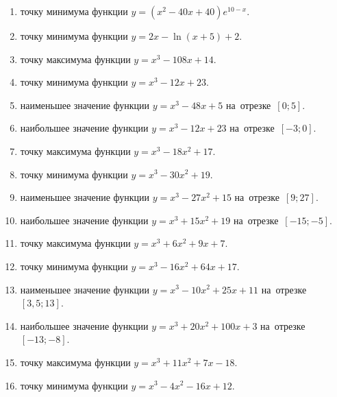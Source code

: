 \documentclass[a4paper,10pt]{article}
\begin{document}
\begin{enumerate}
\item {} точку минимума функции $y=\left(x^2-40x+40\right){{e}^{10-x}}$.

\item {} точку минимума функции $y=2x-\ln \left(x+5\right)+2$.

\item {} точку максимума функции $y=x^3 -108x +14$.

\item {} точку минимума функции $y=x^3 -12x+23$.

\item {} наименьшее значение функции $y=x^3 -48x+5$ на~отрезке~$\left[0;5\right]$.

\item {} наибольшее значение функции $y=x^3 -12x+23$ на~отрезке~$\left[-3;0\right]$.

\item {} точку максимума функции $y=x^3 -18x^2+17$.

\item {} точку минимума функции $y=x^3 -30x^2+19$.

\item {} наименьшее значение функции $y=x^3 -27x^2+15$ на~отрезке~$\left[9;27\right]$.

\item {} наибольшее значение функции $y=x^3 +15x^2+19$ на~отрезке~$\left[-15;-5\right]$.

\item {} точку максимума функции $y=x^3 +6x^2+9x+7$.

\item {} точку минимума функции $y=x^3 -16x^2+64x+17$.

\item {} наименьшее значение функции $y=x^3 -10x^2+25x+11$ на~отрезке~$\left[3,5;13\right]$.

\item {} наибольшее значение функции $y=x^3 +20x^2+100x+3$ на~отрезке~$\left[-13;-8\right]$.

\item {} точку максимума функции $y=x^3 +11x^2+7x-18$.

\item {} точку минимума функции $y=x^3 -4x^2-16x+12$.


\end{enumerate}
\end{document}
